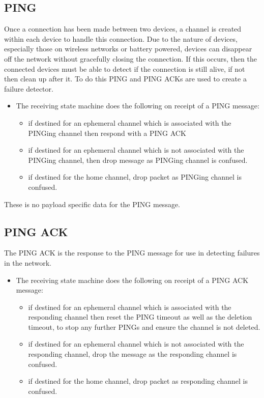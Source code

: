 \subsection{PING} %
\label{sub:ping}
Once a connection has been made between two devices, a channel is created within each device to handle this connection. Due to the nature of devices, especially those on wireless networks or battery powered, devices can disappear off the network without gracefully closing the connection. If this occurs, then the connected devices must be able to detect if the connection is still alive, if not then clean up after it. To do this PING and PING ACKs are used to create a failure detector.

\begin{itemize}
	\item []The receiving state machine does the following on receipt of a PING message:
	\begin{itemize}
		\item if destined for an ephemeral channel which is associated with the PINGing channel then respond with a PING ACK
		\item if destined for an ephemeral channel which is not associated with the PINGing channel, then drop message as PINGing channel is confused.
		\item if destined for the home channel, drop packet as PINGing channel is confused.
	\end{itemize}
\end{itemize}

These is no payload specific data for the PING message.

\subsection{PING ACK} %
\label{sub:ping_ack}
The PING ACK is the response to the PING message for use in detecting failures in the network.

\begin{itemize}
	\item []The receiving state machine does the following on receipt of a PING ACK message:
	\begin{itemize}
		\item if destined for an ephemeral channel which is associated with the responding channel then reset the PING timeout as well as the deletion timeout, to stop any further PINGs and ensure the channel is not deleted. 
		\item if destined for an ephemeral channel which is not associated with the responding channel, drop the message as the responding channel is confused.
		\item if destined for the home channel, drop packet as responding channel is confused.
	\end{itemize}
\end{itemize}

